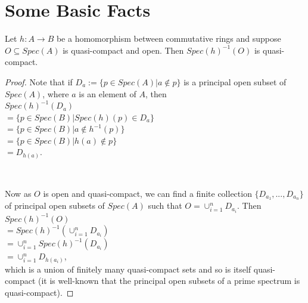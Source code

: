 \chapter{Some Basic Facts}


\begin{lemma}
  Let $h:A\rightarrow{B}$ be a homomorphism between commutative rings and suppose
  $O\subseteq{Spec}(A)$ is quasi-compact and open. Then $Spec(h)^{-1}(O)$ is quasi-compact.
\end{lemma}
\begin{proof}
  Note that if $D_a:=\{p\in{Spec}(A)|a\notin{p}\}$ is a principal open subset of $Spec(A)$, where
  $a$ is an element of $A$, then
  \\
  $Spec(h)^{-1}(D_a)$
  \\
  $=\{p\in{Spec}(B)|Spec(h)(p)\in{D_a}\}$
  \\
  $=\{p\in{Spec}(B)|a\notin{h}^{-1}(p)\}$
  \\
  $=\{p\in{Spec}(B)|h(a)\notin{p}\}$
  \\
  $=D_{h(a)}$.

  \

  Now as $O$ is open and quasi-compact, we can find a finite collection $\{D_{a_1},...,D_{a_n}\}$
  of principal open subsets of $Spec(A)$ such that $O=\cup_{i=1}^n{D_{a_i}}$. Then
  \\
  $Spec(h)^{-1}(O)$
  \\
  $=Spec(h)^{-1}(\cup_{i=1}^n{D_{a_i}})$
  \\
  $=\cup_{i=1}^n{Spec(h)^{-1}(D_{a_i})}$
  \\
  $=\cup_{i=1}^n{D_{h(a_i)}}$,
  \\
  which is a union of finitely many quasi-compact sets and so is itself quasi-compact (it is
  well-known that the principal open subsets of a prime spectrum is quasi-compact).
\end{proof}
